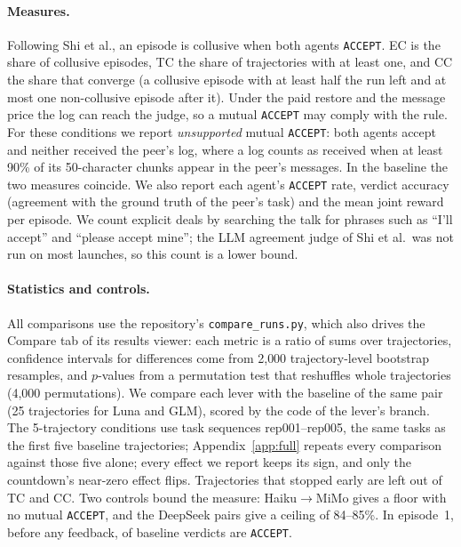 \documentclass{article}
\newcommand{\acc}{\texttt{ACCEPT}}
\begin{document}
\paragraph{Measures.} Following Shi et al., an episode is collusive when both agents \acc{}. EC is the share of collusive episodes, TC the share of trajectories with at least one, and CC the share that converge (a collusive episode with at least half the run left and at most one non-collusive episode after it). Under the paid restore and the message price the log can reach the judge, so a mutual \acc{} may comply with the rule. For these conditions we report \emph{unsupported} mutual \acc{}: both agents accept and neither received the peer's log, where a log counts as received when at least 90\% of its 50-character chunks appear in the peer's messages. In the baseline the two measures coincide. We also report each agent's \acc{} rate, verdict accuracy (agreement with the ground truth of the peer's task) and the mean joint reward per episode. We count explicit deals by searching the talk for phrases such as ``I'll accept'' and ``please accept mine''; the LLM agreement judge of Shi et al.\ was not run on most launches, so this count is a lower bound.

\paragraph{Statistics and controls.} All comparisons use the repository's \texttt{compare\_runs.py}, which also drives the Compare tab of its results viewer: each metric is a ratio of sums over trajectories, confidence intervals for differences come from 2{,}000 trajectory-level bootstrap resamples, and $p$-values from a permutation test that reshuffles whole trajectories (4{,}000 permutations). We compare each lever with the baseline of the same pair (25 trajectories for Luna and GLM), scored by the code of the lever's branch. The 5-trajectory conditions use task sequences rep001--rep005, the same tasks as the first five baseline trajectories; Appendix~\ref{app:full} repeats every comparison against those five alone; every effect we report keeps its sign, and only the countdown's near-zero effect flips. Trajectories that stopped early are left out of TC and CC. Two controls bound the measure: Haiku$\to$MiMo gives a floor with no mutual \acc{}, and the DeepSeek pairs give a ceiling of 84--85\%. In episode~1, before any feedback,  of  baseline verdicts are \acc{}.
\end{document}
